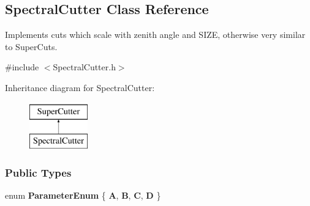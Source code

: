 \hypertarget{classSpectralCutter}{
\subsection{SpectralCutter Class Reference}
\label{classSpectralCutter}
}


Implements cuts which scale with zenith angle and SIZE, otherwise very similar to SuperCuts.  




{\ttfamily \#include $<$SpectralCutter.h$>$}

Inheritance diagram for SpectralCutter:\begin{figure}[H]
\begin{center}
\leavevmode
\includegraphics[height=2.000000cm]{classSpectralCutter}
\end{center}
\end{figure}
\subsubsection*{Public Types}
\begin{DoxyCompactItemize}
\item 
enum {\bfseries ParameterEnum} \{ {\bfseries A}, 
{\bfseries B}, 
{\bfseries C}, 
{\bfseries D}
 \}
\end{DoxyCompactItemize}
